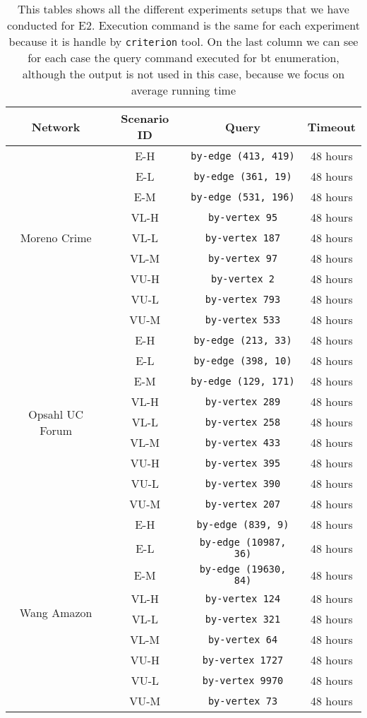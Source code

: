 \begin{table}[H]
\centering
\begin{tabular}{|c|c|c|c|}
  \hline
  \textbf{Network} & \textbf{Scenario ID} & \textbf{Query} & \textbf{Timeout}\\
  \hline
  \multirow{9}{*}{Moreno Crime} & E-H & \texttt{by-edge (413, 419)} & 48 hours \\
  & E-L & \texttt{by-edge (361, 19)} & 48 hours \\
  & E-M & \texttt{by-edge (531, 196)} & 48 hours \\
  & VL-H & \texttt{by-vertex 95} & 48 hours \\
  & VL-L & \texttt{by-vertex 187} & 48 hours \\
  & VL-M & \texttt{by-vertex 97} & 48 hours \\
  & VU-H & \texttt{by-vertex 2} & 48 hours \\
  & VU-L & \texttt{by-vertex 793} & 48 hours \\
  & VU-M & \texttt{by-vertex 533} & 48 hours \\
  \hline
  \multirow{9}{*}{Opsahl UC Forum} & E-H & \texttt{by-edge (213, 33)} & 48 hours \\
  & E-L & \texttt{by-edge (398, 10)} & 48 hours \\
  & E-M & \texttt{by-edge (129, 171)} & 48 hours \\
  & VL-H & \texttt{by-vertex 289} & 48 hours \\
  & VL-L & \texttt{by-vertex 258} & 48 hours \\
  & VL-M & \texttt{by-vertex 433} & 48 hours \\
  & VU-H & \texttt{by-vertex 395} & 48 hours \\
  & VU-L & \texttt{by-vertex 390} & 48 hours \\
  & VU-M & \texttt{by-vertex 207} & 48 hours \\
  \hline
  \multirow{9}{*}{Wang Amazon} & E-H & \texttt{by-edge (839, 9)} & 48 hours \\
  & E-L & \texttt{by-edge (10987, 36)} & 48 hours \\
  & E-M & \texttt{by-edge (19630, 84)} & 48 hours \\
  & VL-H & \texttt{by-vertex 124} & 48 hours \\
  & VL-L & \texttt{by-vertex 321} & 48 hours \\
  & VL-M & \texttt{by-vertex 64} & 48 hours \\
  & VU-H & \texttt{by-vertex 1727} & 48 hours \\
  & VU-L & \texttt{by-vertex 9970} & 48 hours \\
  & VU-M & \texttt{by-vertex 73} & 48 hours \\
  \hline
\end{tabular}
\caption[{[EE] E2 Procedure}]{This tables shows all the different experiments setups that we have conducted for E2. Execution command is the same for each experiment because it is handle by \texttt{criterion} tool. On the last column we can see for each case the query command executed for \acrshort{bt} enumeration, although the output is not used in this case, because we focus on average running time}
\label{table:e2:def}
\end{table}

